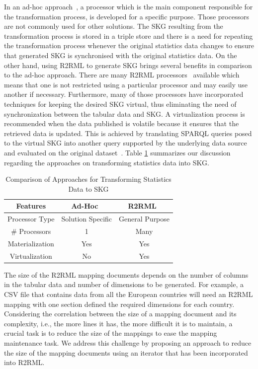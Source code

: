 In an ad-hoc approach~\citep{corcho2017publishing}, a processor which is the main component responsible for the transformation process, is developed for a specific purpose. Those processors are not commonly used for other solutions. The SKG resulting from the transformation process is stored in a triple store and there is a need for repeating the transformation process whenever the original statistics data changes to ensure that generated SKG is synchronised with the original statistics data. On the other hand, using R2RML to generate SKG brings several benefits in comparison to the ad-hoc approach. There are many R2RML processors~\citep{priyatna2014formalisation,calvanese2017ontop} available which means that one is not restricted using a particular processor and may easily use another if necessary. Furthermore, many of those processors have incorporated techniques for keeping the desired SKG virtual, thus eliminating the need of synchronization between the tabular data and SKG. A virtualization process is recommended when the data published is volatile because it ensures that the retrieved data is updated. This is achieved by translating SPARQL queries posed to the virtual SKG into another query supported by the underlying data source and evaluated on the original dataset~\citep{poggi2008linking}. Table \ref{table:chapter4_compare} summarizes our discussion regarding the approaches on transforming statistics data into SKG.

\begin{table}[tbp]
\caption[KG Construction Approaches from Statistics Data]{Comparison of Approaches for Transforming Statistics Data to SKG}
\label{table:chapter4_compare}
\begin{tabular}{c|c|c}
\hline
\textbf{Features} & \textbf{Ad-Hoc~\citep{corcho2017publishing}}   & \textbf{R2RML~\citep{R2RML}}  \\ \hline
Processor Type    & Solution Specific & General Purpose \\ 
\# Processors     & 1                 & Many            \\
Materialization   & Yes               & Yes             \\ 
Virtualization    & No                & Yes             \\ \hline
\end{tabular}
\end{table}

The size of the R2RML mapping documents depends on the number of columns in the tabular data and number of dimensions to be generated. For example, a CSV file that contains data from all the European countries will need an R2RML mapping with one section defined the required dimensions for each country. Considering the correlation between the size of a mapping document and its complexity, i.e., the more lines it has, the more difficult it is to maintain, a crucial task is to reduce the size of the mappings to ease the mapping maintenance task. We address this challenge by proposing an approach to reduce the size of the mapping documents using an iterator that has been incorporated into R2RML.


